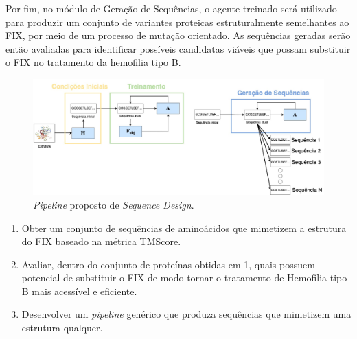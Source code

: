 Por fim, no módulo de Geração de Sequências, 
o agente treinado será utilizado para produzir um conjunto de variantes proteicas estruturalmente semelhantes ao FIX,
por meio de um processo de mutação orientado. 
As sequências geradas serão então avaliadas para identificar possíveis candidatas viáveis 
que possam substituir o FIX no tratamento da hemofilia tipo B.

\begin{figure}[H]
  \centering
  \includegraphics[width=.8\textwidth]{figuras/metodologia-pipeline_proposta.jpg}
  \caption{\textit{Pipeline} proposto de \textit{Sequence Design}.}
  \label{fig:proposta}
\end{figure}


\begin{enumerate}
  \item Obter um conjunto de sequências de aminoácidos que mimetizem a estrutura do FIX baseado na métrica TMScore.
  \item Avaliar, dentro do conjunto de proteínas obtidas em 1, quais possuem potencial de substituir o FIX de modo tornar o tratamento de Hemofilia tipo B mais acessível e eficiente.
  \item Desenvolver um \textit{pipeline} genérico que produza sequências que mimetizem uma estrutura qualquer.
\end{enumerate}

